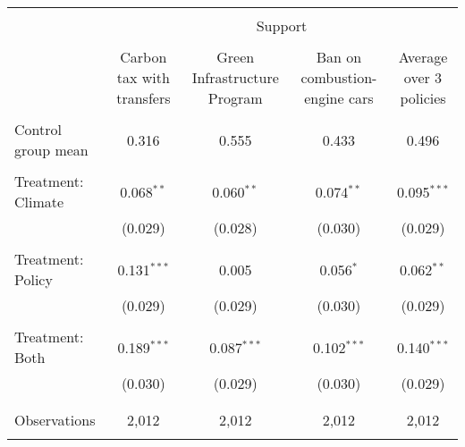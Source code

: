 
\begin{tabular}{@{\extracolsep{5pt}}lcccc} 
\\[-1.8ex]\hline 
\hline \\[-1.8ex] 
 & \multicolumn{4}{c}{Support} \\ 
\cline{2-5} 
\\[-1.8ex] & Carbon tax with transfers & Green Infrastructure Program & Ban on combustion-engine cars & Average over 3 policies \\ 
\hline \\[-1.8ex] 
 Control group mean & 0.316 & 0.555 & 0.433 & 0.496  \\ \hline \\[-1.8ex] Treatment: Climate & 0.068$^{**}$ & 0.060$^{**}$ & 0.074$^{**}$ & 0.095$^{***}$ \\ 
  & (0.029) & (0.028) & (0.030) & (0.029) \\ 
  & & & & \\ 
 Treatment: Policy & 0.131$^{***}$ & 0.005 & 0.056$^{*}$ & 0.062$^{**}$ \\ 
  & (0.029) & (0.029) & (0.030) & (0.029) \\ 
  & & & & \\ 
 Treatment: Both & 0.189$^{***}$ & 0.087$^{***}$ & 0.102$^{***}$ & 0.140$^{***}$ \\ 
  & (0.030) & (0.029) & (0.030) & (0.029) \\ 
  & & & & \\ 
\hline \\[-1.8ex] 

Observations & 2,012 & 2,012 & 2,012 & 2,012 \\ 
\hline 
\hline \\[-1.8ex] 
\end{tabular} 